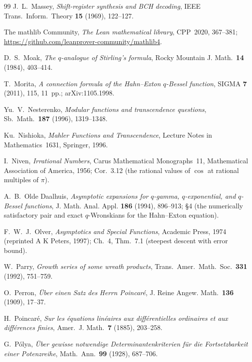 \documentclass[11pt]{article}
\theoremstyle{plain}
\theoremstyle{definition}
\theoremstyle{remark}
\begin{document}
\begin{thebibliography}{99}
 J.~L.~Massey, \emph{Shift-register synthesis and BCH decoding}, IEEE Trans.\
Inform.\ Theory \textbf{15} (1969), 122--127.

 The mathlib Community, \emph{The Lean mathematical library},
CPP~2020, 367--381; \url{https://github.com/leanprover-community/mathlib4}.

 D.~S.~Moak, \emph{The $q$-analogue of Stirling's formula}, Rocky Mountain J.
Math.\ \textbf{14} (1984), 403--414.

 T.~Morita, \emph{A connection formula of the Hahn--Exton $q$-Bessel function},
SIGMA \textbf{7} (2011), 115, 11~pp.; arXiv:1105.1998.

 Yu.~V.~Nesterenko, \emph{Modular functions and transcendence questions},
Sb.\ Math.\ \textbf{187} (1996), 1319--1348.

 Ku.~Nishioka, \emph{Mahler Functions and Transcendence}, Lecture Notes in
Mathematics~1631, Springer, 1996.

 I.~Niven, \emph{Irrational Numbers}, Carus Mathematical Monographs~11,
Mathematical Association of America, 1956; Cor.~3.12 (the rational values of $\cos$ at rational
multiples of $\pi$).

 A.~B.~Olde Daalhuis, \emph{Asymptotic expansions for $q$-gamma, $q$-exponential,
and $q$-Bessel functions}, J. Math. Anal. Appl. \textbf{186} (1994), 896--913; \S4 (the numerically
satisfactory pair and exact $q$-Wronskians for the Hahn--Exton equation).

 F.~W.~J.~Olver, \emph{Asymptotics and Special Functions}, Academic Press, 1974 (reprinted A K Peters, 1997); Ch.~4, Thm.~7.1 (steepest descent with error bound).

 W.~Parry, \emph{Growth series of some wreath products}, Trans.\ Amer.\ Math.\
Soc.\ \textbf{331} (1992), 751--759.

 O.~Perron, \emph{\"Uber einen Satz des Herrn Poincar\'e}, J. Reine Angew.
Math.\ \textbf{136} (1909), 17--37.

 H.~Poincar\'e, \emph{Sur les \'equations lin\'eaires aux diff\'erentielles
ordinaires et aux diff\'erences finies}, Amer.\ J. Math.\ \textbf{7} (1885), 203--258.

\bibitem{Polya1928} G.~P\'olya, \emph{\"Uber gewisse notwendige Determinantenkriterien f\"ur die
Fortsetzbarkeit einer Potenzreihe}, Math.\ Ann.\ \textbf{99} (1928), 687--706.


\end{thebibliography}
\end{document}
